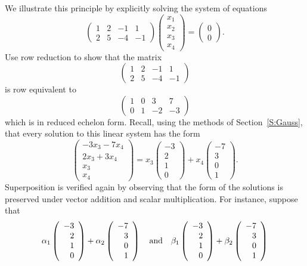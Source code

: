 \documentclass{ximera}
\begin{document}
We illustrate this principle by explicitly solving the system of
equations
\[
\left(\begin{array}{rrrr} 1 & 2 & -1 & 1\\ 2 & 5 & -4 & -1
\end{array}\right)\left(\begin{array}{c} x_1\\x_2\\x_3\\x_4
\end{array}\right) = \left(\begin{array}{c} 0\\0
\end{array}\right).
\]
Use row reduction to show that the matrix
\[
\left(\begin{array}{rrrr} 1 & 2 & -1 & 1\\ 2 & 5 & -4 & -1
\end{array}\right)
\]
is row equivalent to
\[
\left(\begin{array}{rrrr} 1 & 0 & 3 & 7\\ 0 & 1 & -2 & -3
\end{array}\right)
\]
which is in reduced echelon form.  Recall, using the methods of
Section~\ref{S:Gauss}, that every
solution to this linear system has the form
\[
\left(\begin{array}{c} -3x_3-7x_4\\ 2x_3+3x_4\\ x_3\\
x_4\end{array}\right) =
x_3\left(\begin{array}{r}-3\\2\\1\\0\end{array}\right) +
x_4\left(\begin{array}{r}-7\\3\\0\\1\end{array}\right).
\]
Superposition is verified again by observing that the form of 
the solutions is preserved under vector addition and scalar
multiplication.  For instance, suppose that
\[
\alpha_1 \left(\begin{array}{r}-3\\2\\1\\0\end{array}\right) +
\alpha_2 \left(\begin{array}{r}-7\\3\\0\\1\end{array}\right)
\quad\mbox{and}\quad
\beta_1 \left(\begin{array}{r}-3\\2\\1\\0\end{array}\right) +
\beta_2 \left(\begin{array}{r}-7\\3\\0\\1\end{array}\right)
\]
\end{document}
